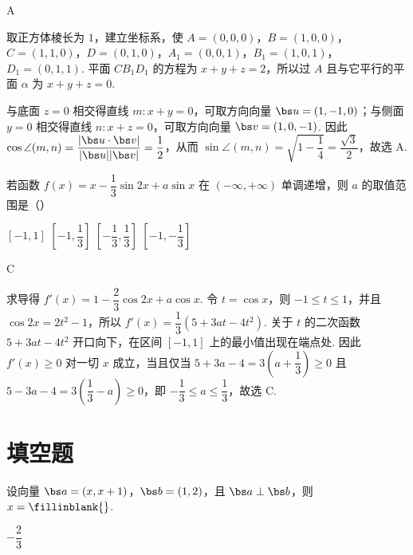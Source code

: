 \begin{answer}
A
\end{answer}

\begin{solution}
取正方体棱长为 \(1\)，建立坐标系，使 \(A=(0,0,0)\)，\(B=(1,0,0)\)，\(C=(1,1,0)\)，\(D=(0,1,0)\)，\(A_1=(0,0,1)\)，\(B_1=(1,0,1)\)，\(D_1=(0,1,1)\). 平面 \(CB_1D_1\) 的方程为 \(x+y+z=2\)，所以过 \(A\) 且与它平行的平面 \(\alpha\) 为 \(x+y+z=0\).

与底面 \(z=0\) 相交得直线 \(m:x+y=0\)，可取方向向量 \(\bs u=(1,-1,0)\)；与侧面 \(y=0\) 相交得直线 \(n:x+z=0\)，可取方向向量 \(\bs v=(1,0,-1)\). 因此 \(\cos\angle(m,n)=\dfrac{|\bs u\cdot\bs v|}{|\bs u||\bs v|}=\dfrac{1}{2}\)，从而 \(\sin\angle(m,n)=\sqrt{1-\dfrac14}=\dfrac{\sqrt3}{2}\)，故选 A.
\end{solution}

\begin{problem}
若函数 \(f(x)=x-\dfrac13\sin 2x+a\sin x\) 在 \((-\infty,+\infty)\) 单调递增，则 \(a\) 的取值范围是（\quad）

\choices
    {\([ -1,1]\)}
    {\([ -1,\dfrac13]\)}
    {\([ -\dfrac13,\dfrac13]\)}
    {\([ -1,-\dfrac13]\)}
\end{problem}

\begin{answer}
C
\end{answer}

\begin{solution}
求导得 \(f'(x)=1-\dfrac23\cos2x+a\cos x\). 令 \(t=\cos x\)，则 \(-1\le t\le1\)，并且 \(\cos2x=2t^2-1\)，所以 \(f'(x)=\dfrac13(5+3at-4t^2)\). 关于 \(t\) 的二次函数 \(5+3at-4t^2\) 开口向下，在区间 \([-1,1]\) 上的最小值出现在端点处. 因此 \(f'(x)\ge0\) 对一切 \(x\) 成立，当且仅当 \(5+3a-4=3(a+\dfrac13)\ge0\) 且 \(5-3a-4=3(\dfrac13-a)\ge0\)，即 \(-\dfrac13\le a\le\dfrac13\)，故选 C.
\end{solution}

\section{填空题}

\begin{problem}
设向量 \(\bs a=(x,x+1)\)，\(\bs b=(1,2)\)，且 \(\bs a\perp\bs b\)，则 \(x=\fillinblank{}\).
\end{problem}

\begin{answer}
\(-\dfrac23\)
\end{answer}

